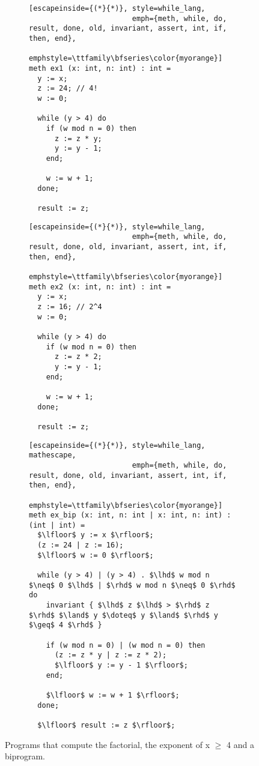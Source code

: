 \begin{figure}[h]
  \centering

  \begin{subfigure}[t]{0.49\textwidth}
    \centering
    \noindent
    \begin{lstlisting}[escapeinside={(*}{*)}, style=while_lang,
                        emph={meth, while, do, result, done, old, invariant, assert, int, if, then, end},
                        emphstyle=\ttfamily\bfseries\color{myorange}]
meth ex1 (x: int, n: int) : int =
  y := x;
  z := 24; // 4!
  w := 0;

  while (y > 4) do
    if (w mod n = 0) then
      z := z * y;
      y := y - 1;
    end;

    w := w + 1;
  done;

  result := z;
    \end{lstlisting}
  \end{subfigure}
  \hfill
  \begin{subfigure}[t]{0.49\textwidth}
    \centering
    \noindent
    \begin{lstlisting}[escapeinside={(*}{*)}, style=while_lang,
                        emph={meth, while, do, result, done, old, invariant, assert, int, if, then, end},
                        emphstyle=\ttfamily\bfseries\color{myorange}]
meth ex2 (x: int, n: int) : int =
  y := x;
  z := 16; // 2^4
  w := 0;

  while (y > 4) do
    if (w mod n = 0) then
      z := z * 2;
      y := y - 1;
    end;

    w := w + 1;
  done;

  result := z;
    \end{lstlisting}
  \end{subfigure}
  \hfill
  \begin{subfigure}[t]{0.99\textwidth}
    \centering
    \noindent
    \begin{lstlisting}[escapeinside={(*}{*)}, style=while_lang, mathescape,
                        emph={meth, while, do, result, done, old, invariant, assert, int, if, then, end},
                        emphstyle=\ttfamily\bfseries\color{myorange}]
meth ex_bip (x: int, n: int | x: int, n: int) : (int | int) =
  $\lfloor$ y := x $\rfloor$;
  (z := 24 | z := 16);
  $\lfloor$ w := 0 $\rfloor$;

  while (y > 4) | (y > 4) . $\lhd$ w mod n $\neq$ 0 $\lhd$ | $\rhd$ w mod n $\neq$ 0 $\rhd$ do
    invariant { $\lhd$ z $\lhd$ > $\rhd$ z $\rhd$ $\land$ y $\doteq$ y $\land$ $\rhd$ y $\geq$ 4 $\rhd$ }

    if (w mod n = 0) | (w mod n = 0) then
      (z := z * y | z := z * 2);
      $\lfloor$ y := y - 1 $\rfloor$;
    end;

    $\lfloor$ w := w + 1 $\rfloor$;
  done;

  $\lfloor$ result := z $\rfloor$;
    \end{lstlisting}
  \end{subfigure}

  \caption{Programs that compute the factorial, the exponent of x $\geq$ 4 and a biprogram.}
  \label{fig:cond_align_loops_ex}
\end{figure}




